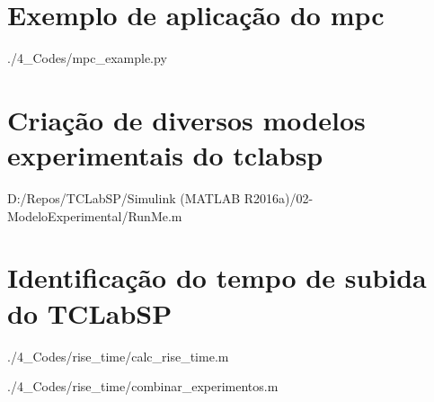 \begin{apendicesenv}
\section{Exemplo de aplicação do \acrlong{mpc}}


	{./4_Codes/mpc_example.py}
	\begin{center}
	\end{center}

\section{Criação de diversos modelos experimentais do \acrshort{tclabsp}}
\label{sec:tclabsp-models-creation}


	{D:/Repos/TCLabSP/Simulink (MATLAB R2016a)/02-ModeloExperimental/RunMe.m}
	\begin{center}
    \end{center}

\section{Identificação do tempo de subida do TCLabSP}
\label{sec:tclabsp_tempo_de_subida}


	{./4_Codes/rise_time/calc_rise_time.m}
	\begin{center}
	\end{center}


	{./4_Codes/rise_time/combinar_experimentos.m}
	\begin{center}
	\end{center}


\end{apendicesenv}
